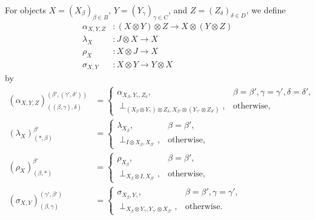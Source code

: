 \documentclass[12pt]{tac}
\theoremstyle{definition}
\theoremstyle{remark}
\newcommand{\<}{\langle}
\renewcommand{\>}{\rangle}
\renewcommand{\:}{\colon}
\begin{document}
For objects $X=(X_\beta)_{\beta\in B}$, $Y=(Y_\gamma)_{\gamma\in C}$, and $Z=(Z_\delta)_{\delta\in D}$, we define
\begin{align*}
\alpha_{X,Y,Z}&:(X\otimes Y)\otimes Z\to X\otimes (Y\otimes Z)\\
\lambda_X&:J\otimes X\to X\\
\rho_X&:X\otimes J\to X\\
\sigma_{X,Y}&:X\otimes Y\to Y\otimes X
\end{align*}
 by 
 \begin{align*}
 (\alpha_{X,Y,Z})_{((\beta,\gamma),\delta)}^{(\beta',(\gamma',\delta'))}& =\begin{cases}
\alpha_{X_\beta,Y_\gamma,Z_\delta}, & \beta=\beta',\gamma=\gamma',\delta=\delta',\\
\perp_{(X_\beta\otimes Y_\gamma)\otimes Z_\delta, X_{\beta'}\otimes(Y_{\gamma'}\otimes Z_{\delta'})}, & \text{otherwise},
\end{cases}     \\
(\lambda_X)_{(*,\beta)}^{\beta'}&=\begin{cases} \lambda_{X_\beta}, & \beta=\beta',\\
\perp_{I\otimes X_{\beta},X_{\beta'}}, & \text{otherwise},
\end{cases}\\
(\rho_X)_{(\beta,*)}^{\beta'}&=\begin{cases} \rho_{X_\beta}, & \beta=\beta',\\
\perp_{ X_{\beta}\otimes I,X_{\beta'}}, & \text{otherwise},
\end{cases}\\
(\sigma_{X,Y})_{(\beta,\gamma)}^{(\gamma',\beta')} & = \begin{cases}
    \sigma_{X_\beta,Y_\gamma}, & \beta=\beta',\gamma=\gamma',\\
    \perp_{X_\beta\otimes Y_\gamma,Y_{\gamma'}\otimes X_{\beta'}}, & \text{otherwise}.
\end{cases}
 \end{align*}
\end{document}
